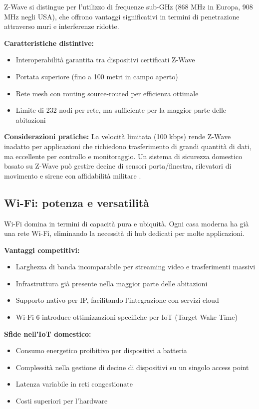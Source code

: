 Z-Wave si distingue per l'utilizzo di frequenze sub-GHz (868 MHz in Europa, 908 MHz negli USA), che offrono vantaggi significativi in termini di penetrazione attraverso muri e interferenze ridotte.

\textbf{Caratteristiche distintive:}
\begin{itemize}
    \item Interoperabilità garantita tra dispositivi certificati Z-Wave
    \item Portata superiore (fino a 100 metri in campo aperto)
    \item Rete mesh con routing source-routed per efficienza ottimale
    \item Limite di 232 nodi per rete, ma sufficiente per la maggior parte delle abitazioni
\end{itemize}

\textbf{Considerazioni pratiche:}
La velocità limitata (100 kbps) rende Z-Wave inadatto per applicazioni che richiedono trasferimento di grandi quantità di dati, ma eccellente per controllo e monitoraggio. Un sistema di sicurezza domestico basato su Z-Wave può gestire decine di sensori porta/finestra, rilevatori di movimento e sirene con affidabilità militare \cite{ZWaveVsZigbee}.

\subsection{Wi-Fi: potenza e versatilità}

Wi-Fi domina in termini di capacità pura e ubiquità. Ogni casa moderna ha già una rete Wi-Fi, eliminando la necessità di hub dedicati per molte applicazioni.

\textbf{Vantaggi competitivi:}
\begin{itemize}
    \item Larghezza di banda incomparabile per streaming video e trasferimenti massivi
    \item Infrastruttura già presente nella maggior parte delle abitazioni
    \item Supporto nativo per IP, facilitando l'integrazione con servizi cloud
    \item Wi-Fi 6 introduce ottimizzazioni specifiche per IoT (Target Wake Time)
\end{itemize}

\textbf{Sfide nell'IoT domestico:}
\begin{itemize}
    \item Consumo energetico proibitivo per dispositivi a batteria
    \item Complessità nella gestione di decine di dispositivi su un singolo access point
    \item Latenza variabile in reti congestionate
    \item Costi superiori per l'hardware
\end{itemize}

